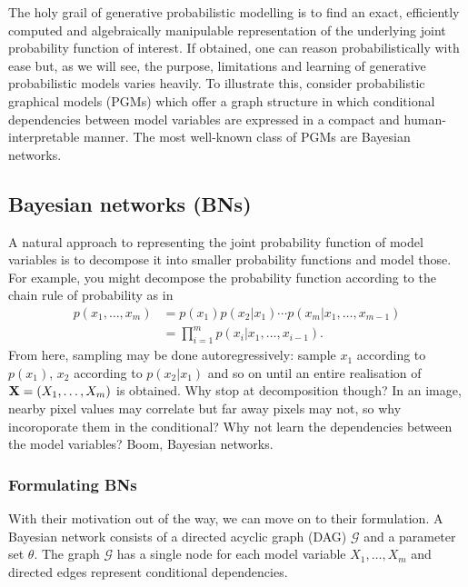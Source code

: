 \documentclass[11pt]{article}
\begin{document}
The holy grail of generative probabilistic modelling is to find an exact, efficiently computed and algebraically manipulable representation of the underlying joint probability function of interest. If obtained, one can reason probabilistically with ease but, as we will see, the purpose, limitations and learning of generative probabilistic models varies heavily. To illustrate this, consider probabilistic graphical models (PGMs) which offer a graph structure in which conditional dependencies between model variables are expressed in a compact and human-interpretable manner. The most well-known class of PGMs are Bayesian networks.

\subsection{\IMPROVE Bayesian networks (BNs)}
A natural approach to representing the joint probability function of model variables is to decompose it into smaller probability functions and model those. For example, you might decompose the probability function according to the chain rule of probability as in
\begin{align*}
    p(x_1,\dots,x_m)
    &=
    p(x_1)p(x_2|x_1)\cdots p(x_m|x_1,\dots,x_{m-1})\\
    &=
    \prod_{i=1}^m p(x_i|x_1,\dots,x_{i-1}).
\end{align*}
From here, sampling may be done autoregressively: sample $x_1$ according to $p(x_1)$, $x_2$ according to $p(x_2|x_1)$ and so on until an entire realisation of $\mathbf{X}=(X_1,\dots,X_m)$ is obtained. Why stop at decomposition though? In an image, nearby pixel values may correlate but far away pixels may not, so why incoroporate them in the conditional? Why not learn the dependencies between the model variables? Boom, Bayesian networks.

\subsubsection{Formulating BNs}
With their motivation out of the way, we can move on to their formulation. A Bayesian network consists of a directed acyclic graph (DAG) $\mathcal{G}$ and a parameter set $\theta$. The graph $\mathcal{G}$ has a single node for each model variable $X_1,\dots,X_m$ and directed edges represent conditional dependencies.
\end{document}
